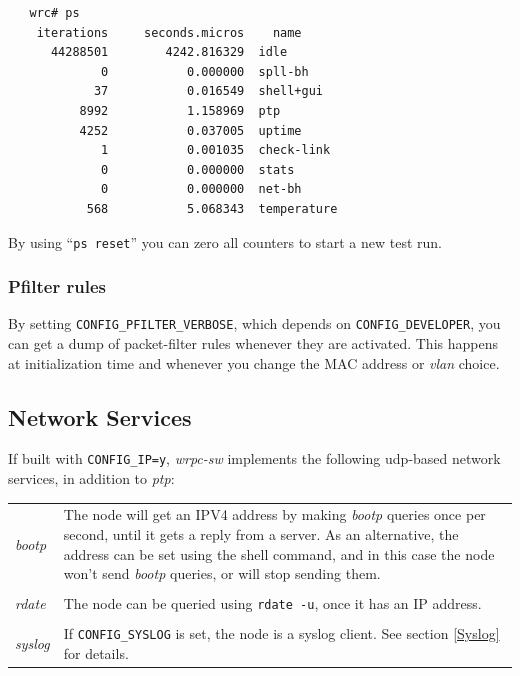 \documentclass[a4paper, 12pt]{article}
\begin{document}
\begin{lstlisting}
   wrc# ps
    iterations     seconds.micros    name
      44288501        4242.816329  idle
             0           0.000000  spll-bh
            37           0.016549  shell+gui
          8992           1.158969  ptp
          4252           0.037005  uptime
             1           0.001035  check-link
             0           0.000000  stats
             0           0.000000  net-bh
           568           5.068343  temperature
\end{lstlisting}

By using ``\texttt{ps reset}'' you can zero all counters to start a new
test run.

\subsubsection{Pfilter rules}
\label{Pfilter rules}

By setting \texttt{CONFIG\_PFILTER\_VERBOSE}, which depends on
\texttt{CONFIG\_DEVELOPER}, you can get a dump of packet-filter rules
whenever they are activated.  This happens at initialization time and
whenever you change the MAC address or \textit{vlan} choice.

\subsection{Network Services}
\label{Network Services}

If built with \texttt{CONFIG\_IP=y}, \textit{wrpc-sw} implements the following
udp-based network services, in addition to \textit{ptp}:

\begin{longtable}{  p{6.5cm}  p{9cm} }

\textit{ bootp } &

	The node will get an IPV4 address by making \textit{bootp} queries
        once per second, until it gets a reply from a server. As an
        alternative, the address can be set using the shell command,
        and in this case the node won't send \textit{bootp} queries, or will
        stop sending them.\\
& \\
\textit{ rdate } &

	The node can be queried using \texttt{rdate -u}, once it has an IP
        address.\\
& \\
\textit{ syslog } &

	If \texttt{CONFIG\_SYSLOG} is set, the node is a syslog client.
        See section \ref{Syslog} for details.\\

\end{longtable}
\end{document}
